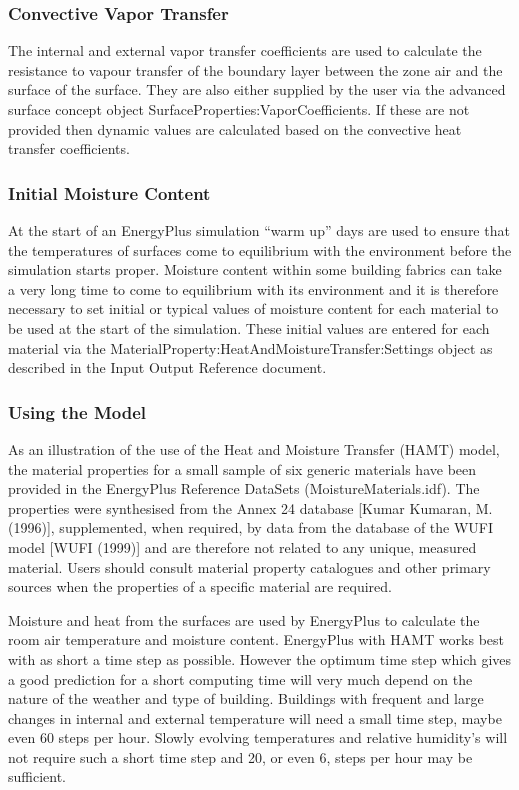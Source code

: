 \subsubsection{Convective Vapor Transfer}\label{convective-vapor-transfer}

The internal and external vapor transfer coefficients are used to calculate the resistance to vapour transfer of the boundary layer between the zone air and the surface of the surface. They are also either supplied by the user via the advanced surface concept object SurfaceProperties:VaporCoefficients. If these are not provided then dynamic values are calculated based on the convective heat transfer coefficients.

\subsubsection{Initial Moisture Content}\label{initial-moisture-content}

At the start of an EnergyPlus simulation ``warm up'' days are used to ensure that the temperatures of surfaces come to equilibrium with the environment before the simulation starts proper. Moisture content within some building fabrics can take a very long time to come to equilibrium with its environment and it is therefore necessary to set initial or typical values of moisture content for each material to be used at the start of the simulation. These initial values are entered for each material via the MaterialProperty:HeatAndMoistureTransfer:Settings object as described in the Input Output Reference document.

\subsubsection{Using the Model}\label{using-the-model}

As an illustration of the use of the Heat and Moisture Transfer (HAMT) model, the material properties for a small sample of six generic materials have been provided in the EnergyPlus Reference DataSets (MoistureMaterials.idf). The properties were synthesised from the Annex 24 database {[}Kumar Kumaran, M. (1996){]}, supplemented, when required, by data from the database of the WUFI model {[}WUFI (1999){]} and are therefore not related to any unique, measured material. Users should consult material property catalogues and other primary sources when the properties of a specific material are required.

Moisture and heat from the surfaces are used by EnergyPlus to calculate the room air temperature and moisture content. EnergyPlus with HAMT works best with as short a time step as possible. However the optimum time step which gives a good prediction for a short computing time will very much depend on the nature of the weather and type of building. Buildings with frequent and large changes in internal and external temperature will need a small time step, maybe even 60 steps per hour. Slowly evolving temperatures and relative humidity's will not require such a short time step and 20, or even 6, steps per hour may be sufficient.

